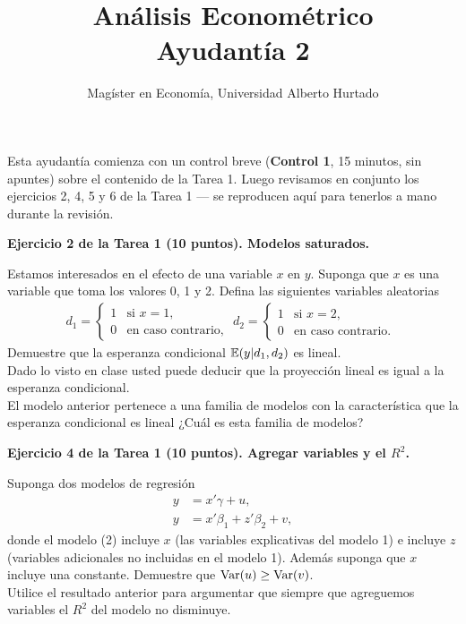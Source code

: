 \documentclass[letterpaper,11pt]{article}
\title{Análisis Econométrico \\ Ayudantía 2}
\author{Magíster en Economía, Universidad Alberto Hurtado}
\date{}
\begin{document}
\maketitle

\noindent Esta ayudantía comienza con un control breve (\textbf{Control 1}, 15 minutos, sin
apuntes) sobre el contenido de la Tarea 1. Luego revisamos en conjunto los ejercicios 2, 4, 5 y
6 de la Tarea 1 --- se reproducen aquí para tenerlos a mano durante la revisión.

\vspace{1em}

\noindent\textbf{Ejercicio 2 de la Tarea 1 (10 puntos). Modelos saturados.}

Estamos interesados en el efecto de una variable $x$ en $y$. Suponga que $x$ es una variable
que toma los valores 0, 1 y 2. Defina las siguientes variables aleatorias
\begin{align*}
d_1 =
\begin{cases}
1 & \mbox{si } x = 1, \\
0 & \mbox{en caso contrario, }
\end{cases}
d_2 =
\begin{cases}
1 & \mbox{si } x = 2, \\
0 & \mbox{en caso contrario. }
\end{cases}
\end{align*}
Demuestre que la esperanza condicional $\operatorname{\mathbb{E}}(y|d_1,d_2)$ es lineal. \\
Dado lo visto en clase usted puede deducir que la proyección lineal es igual a la esperanza
condicional. \\
El modelo anterior pertenece a una familia de modelos con la característica que la esperanza
condicional es lineal ¿Cuál es esta familia de modelos?

\vspace{1em}

\noindent\textbf{Ejercicio 4 de la Tarea 1 (10 puntos). Agregar variables y el $R^2$.}

Suponga dos modelos de regresión
\begin{align}
y &= x'\gamma+u,\\
y &= x'\beta_1+z'\beta_2+v,
\end{align}
donde el modelo (2) incluye $x$ (las variables explicativas del modelo 1) e incluye $z$
(variables adicionales no incluidas en el modelo 1). Además suponga que $x$ incluye una
constante. Demuestre que $\operatorname{Var}(u)\geq \operatorname{Var}(v)$.\\
Utilice el resultado anterior para argumentar que siempre que agreguemos variables el $R^2$ del
modelo no disminuye.
\end{document}
